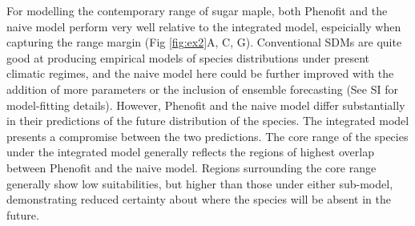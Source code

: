 For modelling the contemporary range of sugar maple, both Phenofit and the naive model perform very well relative to the integrated model, espeicially when capturing the range margin (Fig \ref{fig:ex2}A, C, G).
Conventional SDMs are quite good at producing empirical models of species distributions under present climatic regimes, and the naive model here could be further improved with the addition of more parameters or the inclusion of ensemble forecasting (See SI for model-fitting details).
However, Phenofit and the naive model differ substantially in their predictions of the future distribution of the species.
The integrated model presents a compromise between the two predictions. 
The core range of the species under the integrated model generally reflects the regions of highest overlap between Phenofit and the naive model.
Regions surrounding the core range generally show low suitabilities, but higher than those under either sub-model, demonstrating reduced certainty about where the species will be absent in the future.


